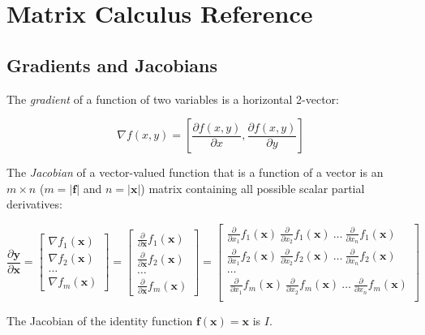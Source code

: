 \documentclass[11pt]{article}
\begin{document}
\section{Matrix Calculus Reference}

\subsection{Gradients and Jacobians}

The {\em gradient} of a function of two variables is a horizontal 2-vector:

\[
\nabla f(x,y)  = [ \frac{\partial f(x,y)}{\partial x}, \frac{\partial f(x,y)}{\partial y}]
\]

The {\em Jacobian} of a vector-valued function that is a function of a vector is an $m \times n$ ($m=|\mathbf{f}|$ and $n=|\mathbf{x}|$) matrix containing all possible scalar partial derivatives:

\[
\frac{\partial \mathbf{y}}{\partial \mathbf{x}} = \begin{bmatrix}
\nabla f_1(\mathbf{x}) \\
\nabla f_2(\mathbf{x})\\
\ldots\\
\nabla f_m(\mathbf{x})
\end{bmatrix} = \begin{bmatrix}
\frac{\partial}{\partial \mathbf{x}} f_1(\mathbf{x}) \\
\frac{\partial}{\partial \mathbf{x}} f_2(\mathbf{x})\\
\ldots\\
\frac{\partial}{\partial \mathbf{x}} f_m(\mathbf{x})
\end{bmatrix} = \begin{bmatrix}
\frac{\partial}{\partial {x_1}} f_1(\mathbf{x})~ \frac{\partial}{\partial {x_2}} f_1(\mathbf{x}) ~\ldots~ \frac{\partial}{\partial {x_n}} f_1(\mathbf{x}) \\
\frac{\partial}{\partial {x_1}} f_2(\mathbf{x})~ \frac{\partial}{\partial {x_2}} f_2(\mathbf{x}) ~\ldots~ \frac{\partial}{\partial {x_n}} f_2(\mathbf{x}) \\
\ldots\\
~\frac{\partial}{\partial {x_1}} f_m(\mathbf{x})~ \frac{\partial}{\partial {x_2}} f_m(\mathbf{x}) ~\ldots~ \frac{\partial}{\partial {x_n}} f_m(\mathbf{x}) \\
\end{bmatrix}
\]

The Jacobian of the identity function $\mathbf{f(x)} = \mathbf{x}$ is $I$.
\end{document}
